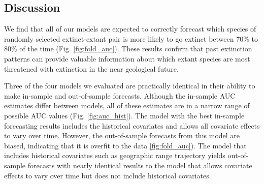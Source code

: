 \documentclass[12pt,letterpaper]{article}
\begin{document}
\begin{refsection}
\section{Discussion}

We find that all of our models are expected to correctly forecast which species of randomly selected extinct-extant pair is more likely to go extinct between 70\% to 80\% of the time (Fig. \ref{fig:fold_auc}). These results confirm that past extinction patterns can provide valuable information about which extant species are most threatened with extinction in the near geological future.

Three of the four models we evaluated are practically identical in their ability to make in-sample and out-of-sample forecasts. Although the in-sample AUC estimates differ between models, all of these estimates are in a narrow range of possible AUC values (Fig. \ref{fig:auc_hist}). The model with the best in-sample forecasting results includes the historical covariates and allows all covariate effects to vary over time. However, the out-of-sample forecasts from this model are biased, indicating that it is overfit to the data \ref{fig:fold_auc}). The model that includes historical covariates such as geographic range trajectory yields out-of-sample forecasts with nearly identical results to the model that allows covariate effects to vary over time but does not include historical covariates. 


\end{refsection}
\end{document}

